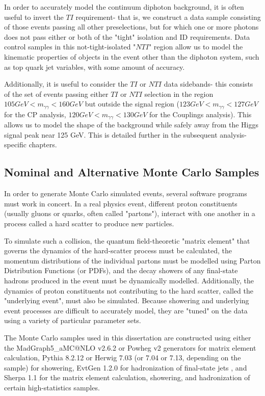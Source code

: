 In order to accurately model the continuum diphoton background, it is often useful to invert the $TI$ requirement- that is, we construct a data sample consisting of those events passing all other preselections, but for which one or more photons does not pass either or both of the "tight" isolation and ID requirements. Data control samples in this not-tight-isolated "$NTI$" region allow us to model the kinematic properties of objects in the event other than the diphoton system, such as top quark jet variables, with some amount of accuracy.

Additionally, it is useful to consider the $TI$ or $NTI$ data sidebands- this consists of the set of events passing either $TI$ or $NTI$ selection in the region $105 GeV < m_{\gamma\gamma} < 160 GeV$ but outside the signal region ($123 GeV < m_{\gamma\gamma} < 127 GeV$ for the CP analysis, $120 GeV < m_{\gamma\gamma} < 130 GeV$ for the Couplings analysis). This allows us to model the shape of the background while safely away from the Higgs signal peak near 125 GeV. This is detailed further in the subsequent analysis-specific chapters.

\subsection{Nominal and Alternative Monte Carlo Samples} \label{sec:NominalMC} 

In order to generate Monte Carlo simulated events, several software programs must work in concert. In a real physics event, different proton constituents (usually gluons or quarks, often called "partons"), interact with one another in a process called a hard scatter to produce new particles. 

To simulate such a collision, the quantum field-theoretic "matrix element" that governs the dynamics of the hard-scatter process must be calculated, the momentum distributions of the individual partons must be modelled using Parton Distribution Functions (or PDFs), and the decay showers of any final-state hadrons produced in the event must be dynamically modelled. Additionally, the dynamics of proton constituents not contributing to the hard scatter, called the "underlying event", must also be simulated. Because showering and underlying event processes are difficult to accurately model, they are "tuned" on the data using a variety of particular parameter sets. 

\begin{sloppypar}
The Monte Carlo samples used in this dissertation are constructed using either the {MadGraph5\_aMC@NLO} v2.6.2 \cite{MG5} or Powheg v2 \cite{Powheg} \cite{PowhegBox} generators for matrix element calculation, Pythia 8.2.12 \cite{Pythia8.1} \cite{Pythia8.2} or Herwig 7.03 (or 7.04 or 7.13, depending on the sample) \cite{Herwig} \cite{Herwig7} \cite{Herwig7.1} for showering, EvtGen 1.2.0 for hadronization of final-state jets \cite{EvGen}, and Sherpa 1.1 \cite{Sherpa1} \cite{Sherpa2} \cite{Comix} for the matrix element calculation, showering, and hadronization of certain high-statistics samples.
\end{sloppypar}

